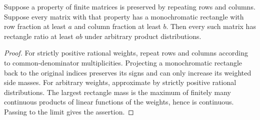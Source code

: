 \begin{lemma}\label{lem:product-weights}
Suppose a property of finite matrices is preserved by repeating rows and columns. Suppose every matrix with that property has a monochromatic rectangle with row fraction at least $a$ and column fraction at least $b$. Then every such matrix has rectangle ratio at least $ab$ under arbitrary product distributions.
\end{lemma}

\begin{proof}
For strictly positive rational weights, repeat rows and columns according to common-denominator multiplicities. Projecting a monochromatic rectangle back to the original indices preserves its signs and can only increase its weighted side masses. For arbitrary weights, approximate by strictly positive rational distributions. The largest rectangle mass is the maximum of finitely many continuous products of linear functions of the weights, hence is continuous. Passing to the limit gives the assertion.
\end{proof}
